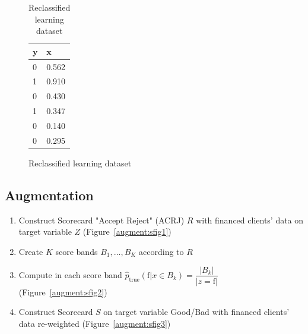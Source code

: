 \begin{table}
{\begin{multicols}{3}
\begin{subfigure}[t]{0.31\textwidth}
\begin{center}
\begin{adjustbox}{max width=\textwidth}
\begin{tabular}{l l}
\toprule
\textbf{${\bm{y}}$} & \textbf{${\bm{x}}$}\\
\midrule
0 & 0.562 \\
1 & 0.910 \\
0 & 0.430 \\
1 & 0.347 \\
0 & 0.140 \\
0 & 0.295 \\
\bottomrule
\end{tabular}
\end{adjustbox}
\end{center}
\caption{Reclassified learning dataset}
\label{reclass:sfig3}
\end{subfigure}

\end{multicols}
}
\end{table}


\subsection{Augmentation} \label{augmentation}

\begin{enumerate}
\item Construct Scorecard "Accept Reject" (ACRJ) $R$ with financed clients' data on target variable $Z$ (Figure~\ref{augment:sfig1})
\item Create $K$ score bands $B_1, \ldots, B_K$ according to $R$
\item Compute in each score band $\hat{p}_{\text{true}}(\text{f}|x \in B_k) = \dfrac{|B_k|}{|z=\text{f}|}$ (Figure~\ref{augment:sfig2})
\item Construct Scorecard $S$ on target variable Good/Bad with financed clients' data re-weighted (Figure~\ref{augment:sfig3})
\end{enumerate}

